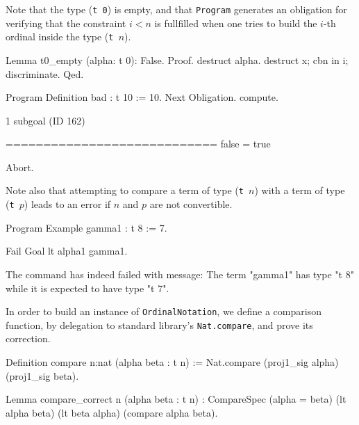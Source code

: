 \documentclass[a4paper]{book}
\begin{document}
Note that the type (\texttt{t 0}) is empty, and that \texttt{Program} generates an obligation
for verifying that the constraint $i<n$ is fullfilled when one tries to build the $i$-th ordinal inside the type (\texttt{t $n$}).

\begin{Coqsrc}
Lemma t0_empty (alpha: t 0): False.
Proof.
  destruct alpha.
  destruct x; cbn in i; discriminate.
Qed.


Program Definition bad : t 10 := 10.
Next Obligation.
  compute.
\end{Coqsrc}

\begin{Coqanswer}
1 subgoal (ID 162)
  
  ============================
  false = true
\end{Coqanswer}

\begin{Coqsrc}
Abort.
\end{Coqsrc}

Note also that attempting to compare a term  of type (\texttt{t $n$}) with a term of
type (\texttt{t $p$})  leads to an error if $n$ and $p$ are not convertible.

\begin{Coqsrc}

Program Example gamma1 : t 8 := 7.

Fail Goal lt alpha1 gamma1.
\end{Coqsrc}

\begin{Coqanswer}
 The command has indeed failed with message:
The term "gamma1" has type "t 8" while it is expected to have type "t 7".
\end{Coqanswer}


In order to build an instance of \texttt{OrdinalNotation}, we define a comparison function, by delegation to standard library's  \texttt{Nat.compare}, and prove its correction.

\begin{Coqsrc}
Definition compare {n:nat} (alpha beta : t n) :=
  Nat.compare (proj1_sig alpha) (proj1_sig beta).

Lemma compare_correct {n} (alpha beta : t n) :
  CompareSpec (alpha = beta) (lt alpha beta) (lt beta alpha)
              (compare alpha beta).
\end{Coqsrc}
\end{document}
